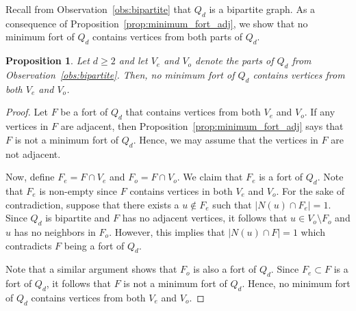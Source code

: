 \documentclass[twoside, 12pt]{article}
\newtheorem{proposition}[theorem]{Proposition}
\theoremstyle{definition}
\newcommand\abs[1]{\left|#1\right|}
\begin{document}
Recall from Observation~\ref{obs:bipartite} that $Q_{d}$ is a bipartite graph.
As a consequence of Proposition~\ref{prop:minimum_fort_adj}, we show that no minimum fort of $Q_{d}$ contains vertices from both parts of $Q_{d}$.
\begin{proposition}\label{prop:even_dist}
Let $d\geq 2$ and let $V_{e}$ and $V_{o}$ denote the parts of $Q_{d}$ from Observation~\ref{obs:bipartite}. 
Then, no minimum fort of $Q_{d}$ contains vertices from both $V_{e}$ and $V_{o}$.
\end{proposition}
\begin{proof}
Let $F$ be a fort of $Q_{d}$ that contains vertices from both $V_{e}$ and $V_{o}$. 
If any vertices in $F$ are adjacent, then Proposition~\ref{prop:minimum_fort_adj} says that $F$ is not a minimum fort of $Q_{d}$.
Hence, we may assume that the vertices in $F$ are not adjacent. 

Now, define $F_{e}=F\cap V_{e}$ and $F_{o}=F\cap V_{o}$.
We claim that $F_{e}$ is a fort of $Q_{d}$.
Note that $F_{e}$ is non-empty since $F$ contains vertices in both $V_{e}$ and $V_{o}$.
For the sake of contradiction, suppose that there exists a $u\notin F_{e}$ such that $\abs{N(u)\cap F_{e}}=1$.
Since $Q_{d}$ is bipartite and $F$ has no adjacent vertices, it follows that $u\in V_{o}\setminus{F_{o}}$ and $u$ has no neighbors in $F_{o}$.
However, this implies that $\abs{N(u)\cap F}=1$ which contradicts $F$ being a fort of $Q_{d}$.

Note that a similar argument shows that $F_{o}$ is also a fort of $Q_{d}$. 
Since $F_{e}\subset F$ is a fort of $Q_{d}$, it follows that $F$ is not a minimum fort of $Q_{d}$.
Hence, no minimum fort of $Q_{d}$ contains vertices from both $V_{e}$ and $V_{o}$.
\end{proof}
\end{document}
